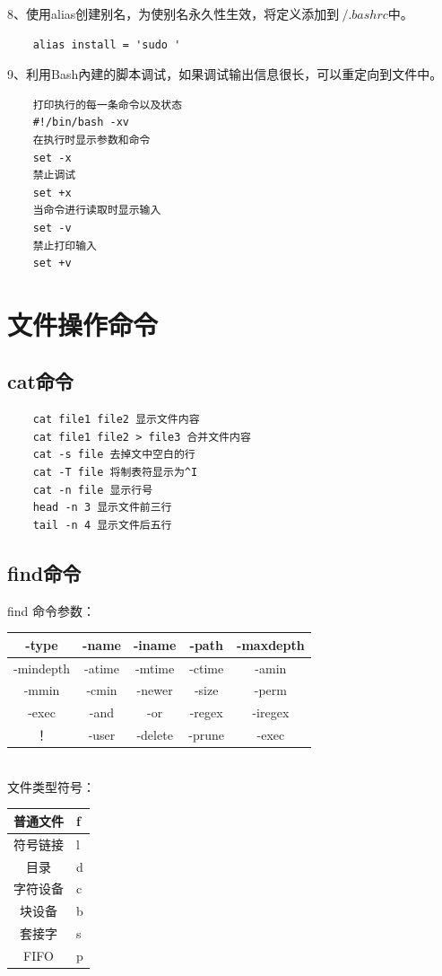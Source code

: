 \documentclass[twocolumn]{article}
\begin{document}
	8、使用alias创建别名，为使别名永久性生效，将定义添加到$~/.bashrc$中。
	\begin{lstlisting}
	alias install = 'sudo '
	\end{lstlisting}
	
	
	9、利用Bash內建的脚本调试，如果调试输出信息很长，可以重定向到文件中。
	\begin{lstlisting}
	打印执行的每一条命令以及状态
	#!/bin/bash -xv
	在执行时显示参数和命令
	set -x
	禁止调试
	set +x 
	当命令进行读取时显示输入
	set -v
	禁止打印输入
	set +v 
	\end{lstlisting}
	
	\section{文件操作命令}
	\subsection{cat命令}
	\begin{lstlisting}
	cat file1 file2 显示文件内容
	cat file1 file2 > file3 合并文件内容
	cat -s file 去掉文中空白的行
	cat -T file 将制表符显示为^I
	cat -n file 显示行号
	head -n 3 显示文件前三行
	tail -n 4 显示文件后五行
	\end{lstlisting}

	\subsection{find命令}
	\noindent find 命令参数：
	
	\begin{tabular}{|c|c|c|c|c|}
		\hline
		-type & -name & -iname & -path & -maxdepth\\
		\hline
		-mindepth &-atime & -mtime & -ctime &-amin \\
		\hline
		 -mmin & -cmin & -newer & -size &-perm \\
		 \hline
		 -exec & -and & -or & -regex & -iregex\\
		 \hline
		 ！& -user & -delete & -prune & -exec\\
		 \hline
	\end{tabular}
	\\
	
	\noindent 文件类型符号：
	
	\begin{tabular}{|c|p{6.3cm}|}
		\hline
		普通文件 & f \\
		\hline
		符号链接 & l \\
		\hline
		目录 & d \\
		\hline
		字符设备 & c \\
		\hline
		块设备 & b \\
		\hline
		套接字 & s \\
		\hline
		FIFO & p\\
		\hline
	\end{tabular}
	\\
	
\end{document}

